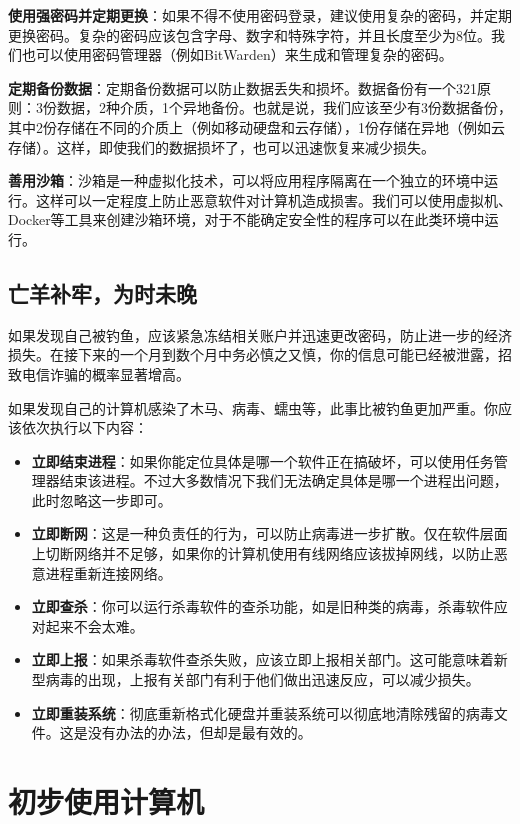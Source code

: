 \textbf{使用强密码并定期更换}：如果不得不使用密码登录，建议使用复杂的密码，并定期更换密码。复杂的密码应该包含字母、数字和特殊字符，并且长度至少为8位。我们也可以使用密码管理器（例如BitWarden）来生成和管理复杂的密码。

\textbf{定期备份数据}：定期备份数据可以防止数据丢失和损坏。数据备份有一个321原则：3份数据，2种介质，1个异地备份。也就是说，我们应该至少有3份数据备份，其中2份存储在不同的介质上（例如移动硬盘和云存储），1份存储在异地（例如云存储）。这样，即使我们的数据损坏了，也可以迅速恢复来减少损失。

\textbf{善用沙箱}：沙箱是一种虚拟化技术，可以将应用程序隔离在一个独立的环境中运行。这样可以一定程度上防止恶意软件对计算机造成损害。我们可以使用虚拟机、Docker等工具来创建沙箱环境，对于不能确定安全性的程序可以在此类环境中运行。

\subsection{亡羊补牢，为时未晚}

如果发现自己被钓鱼，应该紧急冻结相关账户并迅速更改密码，防止进一步的经济损失。在接下来的一个月到数个月中务必慎之又慎，你的信息可能已经被泄露，招致电信诈骗的概率显著增高。

如果发现自己的计算机感染了木马、病毒、蠕虫等，此事比被钓鱼更加严重。你应该依次执行以下内容：

\begin{itemize}
  \item \textbf{立即结束进程}：如果你能定位具体是哪一个软件正在搞破坏，可以使用任务管理器结束该进程。不过大多数情况下我们无法确定具体是哪一个进程出问题，此时忽略这一步即可。
  \item \textbf{立即断网}：这是一种负责任的行为，可以防止病毒进一步扩散。仅在软件层面上切断网络并不足够，如果你的计算机使用有线网络应该拔掉网线，以防止恶意进程重新连接网络。
  \item \textbf{立即查杀}：你可以运行杀毒软件的查杀功能，如是旧种类的病毒，杀毒软件应对起来不会太难。
  \item \textbf{立即上报}：如果杀毒软件查杀失败，应该立即上报相关部门。这可能意味着新型病毒的出现，上报有关部门有利于他们做出迅速反应，可以减少损失。
  \item \textbf{立即重装系统}：彻底重新格式化硬盘并重装系统可以彻底地清除残留的病毒文件。这是没有办法的办法，但却是最有效的。
\end{itemize}

\section{初步使用计算机}

